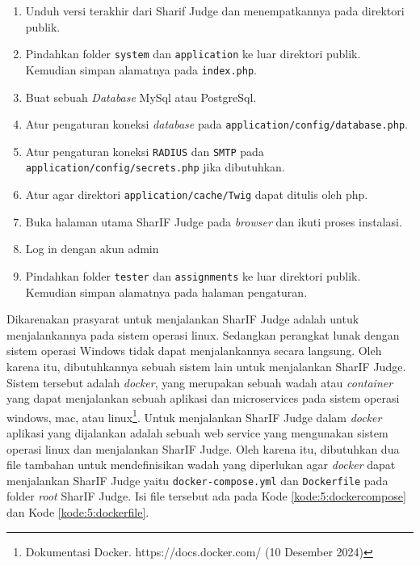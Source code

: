 \documentclass[a4paper,twoside]{article}
\begin{document}
\begin{enumerate}
\begin{itemize}
		            \begin{enumerate}
			            \item Unduh versi terakhir dari Sharif Judge dan menempatkannya pada direktori publik.
			            \item Pindahkan folder \texttt{system} dan \texttt{application} ke luar direktori publik. Kemudian simpan alamatnya pada \texttt{index.php}.
			            \item Buat sebuah \textit{Database} MySql atau PostgreSql.
			            \item Atur pengaturan koneksi \textit{database} pada \texttt{application/config/database.php}.
			            \item Atur pengaturan koneksi \texttt{RADIUS} dan \texttt{SMTP} pada \texttt{application/config/secrets.php} jika dibutuhkan.
			            \item Atur agar direktori \texttt{application/cache/Twig} dapat ditulis oleh php.
			            \item Buka halaman utama SharIF Judge pada \textit{browser} dan ikuti proses instalasi.
			            \item Log in dengan akun admin
			            \item Pindahkan folder \texttt{tester} dan \texttt{assignments} ke luar direktori publik. Kemudian simpan alamatnya pada halaman pengaturan.
		            \end{enumerate}

		            Dikarenakan prasyarat untuk menjalankan SharIF Judge adalah untuk menjalankannya pada sistem operasi linux. Sedangkan perangkat lunak dengan sistem operasi Windows tidak dapat menjalankannya secara langsung. Oleh karena itu, dibutuhkannya sebuah sistem lain untuk menjalankan SharIF Judge. Sistem tersebut adalah \textit{docker}, yang merupakan sebuah wadah atau \textit{container} yang dapat menjalankan sebuah aplikasi dan microservices pada sistem operasi windows, mac, atau linux\footnote{Dokumentasi Docker. https://docs.docker.com/ (10 Desember 2024)}. Untuk menjalankan SharIF Judge dalam \textit{docker} aplikasi yang dijalankan adalah sebuah web service yang mengunakan sistem operasi linux dan menjalankan SharIF Judge. Oleh karena itu, dibutuhkan dua file tambahan untuk mendefinisikan wadah yang diperlukan agar \textit{docker} dapat menjalankan SharIF Judge yaitu \verb|docker-compose.yml| dan \verb|Dockerfile| pada folder \textit{root} SharIF Judge. Isi file tersebut ada pada Kode \ref{kode:5:dockercompose} dan Kode \ref{kode:5:dockerfile}.


\end{itemize}
\end{enumerate}
\end{document}
